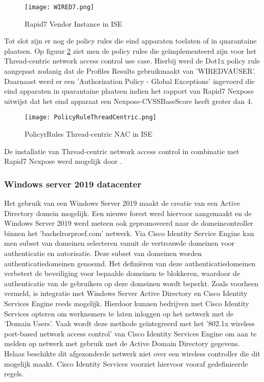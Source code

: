  \begin{figure}[H]
	 	\centering
	 	\texttt{[image: WIRED7.png]}
	 	\caption{Rapid7 Vendor Instance in ISE}%
	 	\label{fig:WIRED}%
 \end{figure}

Tot slot zijn er nog de policy rules die eind apparaten toelaten of in
quarantaine plaatsen. Op figuur \ref{fig:quarin} ziet men de policy rules die geïmplementeerd zijn voor het Thread-centric network access control use case. Hierbij werd de Dot1x policy rule aangepast zodanig dat de Profiles Results gebruikmaakt van 'WIRED\textunderscore VA\textunderscore USER'. Daarnaast werd er een 'Authorization Policy - Global Exceptions' ingevoerd die eind apparaten in quarantaine plaatsen indien het rapport van Rapid7 Nexpose uitwijst dat het eind apparaat een Nexpose-CVSS\textunderscore Base\textunderscore Score heeft groter dan 4. 

  \begin{figure}[H]
 	\centering
 	\texttt{[image: PolicyRuleThreadCentric.png]}
 	\caption{PolicyrRules Thread-centric NAC in ISE}%
 	\label{fig:quarin}%
 \end{figure}
 
 De installatie van Thread-centric network access control in combinatie met Rapid7 Nexpose werd mogelijk door \cite{thread_yt}.

 
\subsubsection{Windows server 2019 datacenter}
Het gebruik van een Windows Server 2019 maakt de creatie van een Active Directory domein mogelijk. Een nieuwe forest werd hiervoor aangemaakt en de Windows Server 2019 werd meteen ook gepromoveerd naar de domeincontroller binnen het 'bachelrorproef.com' netwerk.
\newline
\newline
Via Cisco Identity Service Engine kan men subset van domeinen selecteren vanuit de vertrouwde domeinen voor authenticatie en autorisatie. Deze subset van domeinen worden authenticatiedomeinen genoemd. Het definiëren van deze authenticatiedomeinen verbetert de beveiliging voor bepaalde domeinen te blokkeren, waardoor de authenticatie van de gebruikers op deze domeinen wordt beperkt.
\newline
\newline
Zoals voorheen vermeld, is integratie met Windows Server Active Directory en Cisco Identity Services Engine reeds mogelijk. Hierdoor kunnen bedrijven met Cisco Identity Services opteren om werknemers te laten inloggen op het netwerk met de 'Domain Users’. Vaak wordt deze methode geïntegreerd met het '802.1x wireless port-based network access control' van Cisco Identity Services Engine om aan te melden op netwerk met gebruik met de Active Domain Directory gegevens. Helaas beschikte dit afgezonderde netwerk niet over een wireless controller die dit mogelijk maakt. Cisco Identity Services voorziet hiervoor vooraf gedefinieerde regels.

